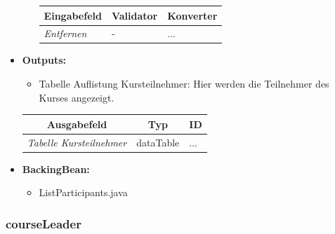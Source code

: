 \begin{itemize}
\begin{itemize}
				\begin{center}
					\begin{longtable}{|p{3cm} |p{8cm} | p{5cm}|}
						
						\hline \multicolumn{1}{|c|}{\textbf{Eingabefeld}} & \multicolumn{1}{|c|}{\textbf{Validator}} & \multicolumn{1}{|c|}{\textbf{Konverter}} \\ \hline
						\endfirsthead
						\hline
						\endlastfoot
						\textit{Entfernen} & - & ... \\ \hline
					\end{longtable}
				\end{center}
				
			\end{itemize}
			\item \textbf{Outputs:} 
			\begin{itemize}
				\item Tabelle Auflistung Kursteilnehmer: Hier werden die Teilnehmer des Kurses angezeigt.
			\end{itemize}
			
			\begin{center}
				\begin{longtable}{|p{5cm} | p{4cm}|p{3cm}|}
					
					\hline \multicolumn{1}{|c|}{\textbf{Ausgabefeld}} & \multicolumn{1}{|c|}{\textbf{Typ}}  &  \multicolumn{1}{|c|}{\textbf{ID}} \\ \hline
					\endfirsthead
					\hline
					\endlastfoot
					\textit{Tabelle Kursteilnehmer}  & dataTable & ... \\ \hline
				\end{longtable}
			\end{center}
			
			
			\item \textbf{BackingBean:}
			\begin{itemize}
				\item ListParticipants.java
			\end{itemize}
		\end{itemize}
		
		\subsubsection{courseLeader}
		
